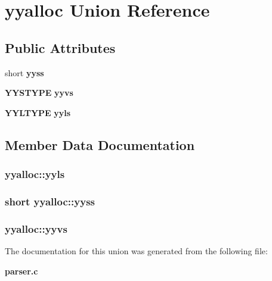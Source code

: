 \section{yyalloc  Union Reference}
\label{unionyyalloc}
\subsection*{Public Attributes}
\begin{CompactItemize}
\item 
short {\bf yyss}
\item 
{\bf YYSTYPE} {\bf yyvs}
\item 
{\bf YYLTYPE} {\bf yyls}
\end{CompactItemize}


\subsection{Member Data Documentation}
\subsubsection{ yyalloc::yyls}\label{unionyyalloc_m2}


\subsubsection{\setlength{\rightskip}{0pt plus 5cm}short yyalloc::yyss}\label{unionyyalloc_m0}


\subsubsection{ yyalloc::yyvs}\label{unionyyalloc_m1}




The documentation for this union was generated from the following file:\begin{CompactItemize}
\item 
{\bf parser.c}\end{CompactItemize}
